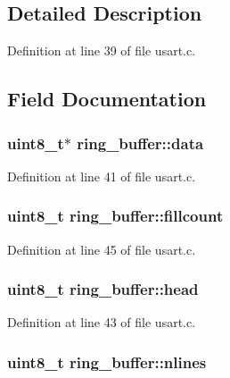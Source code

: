 \subsection{Detailed Description}


Definition at line 39 of file usart.\-c.



\subsection{Field Documentation}
\hypertarget{structring__buffer_afd2830d5078005b02a9621169c6cf1f4}{
\subsubsection[{data}]{\setlength{\rightskip}{0pt plus 5cm}uint8\-\_\-t$\ast$ ring\-\_\-buffer\-::data}}\label{structring__buffer_afd2830d5078005b02a9621169c6cf1f4}


Definition at line 41 of file usart.\-c.

\hypertarget{structring__buffer_abf5dc043ad613d205133e0800570fec2}{
\subsubsection[{fillcount}]{\setlength{\rightskip}{0pt plus 5cm}uint8\-\_\-t ring\-\_\-buffer\-::fillcount}}\label{structring__buffer_abf5dc043ad613d205133e0800570fec2}


Definition at line 45 of file usart.\-c.

\hypertarget{structring__buffer_af1343044f173745cd6b3d70b10a3c5bb}{
\subsubsection[{head}]{\setlength{\rightskip}{0pt plus 5cm}uint8\-\_\-t ring\-\_\-buffer\-::head}}\label{structring__buffer_af1343044f173745cd6b3d70b10a3c5bb}


Definition at line 43 of file usart.\-c.

\hypertarget{structring__buffer_aafdca1edc68f0b8080f87d0b3a64e62e}{
\subsubsection[{nlines}]{\setlength{\rightskip}{0pt plus 5cm}uint8\-\_\-t ring\-\_\-buffer\-::nlines}}\label{structring__buffer_aafdca1edc68f0b8080f87d0b3a64e62e}


